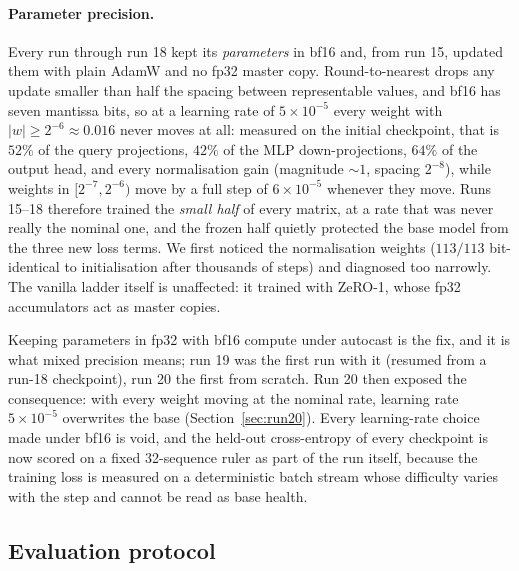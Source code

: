 \documentclass{article} %
\begin{document}
\paragraph{Parameter precision.}
\label{sec:precision}
Every run through run 18 kept its \emph{parameters} in bf16 and, from run 15, updated them with plain AdamW and no fp32 master copy. Round-to-nearest drops any update smaller than half the spacing between representable values, and bf16 has seven mantissa bits, so at a learning rate of $5\times10^{-5}$ every weight with $|w| \ge 2^{-6} \approx 0.016$ never moves at all: measured on the initial checkpoint, that is $52\%$ of the query projections, $42\%$ of the MLP down-projections, $64\%$ of the output head, and every normalisation gain (magnitude ${\sim}1$, spacing $2^{-8}$), while weights in $[2^{-7}, 2^{-6})$ move by a full step of $6\times10^{-5}$ whenever they move. Runs 15--18 therefore trained the \emph{small half} of every matrix, at a rate that was never really the nominal one, and the frozen half quietly protected the base model from the three new loss terms. We first noticed the normalisation weights ($113/113$ bit-identical to initialisation after thousands of steps) and diagnosed too narrowly. The vanilla ladder itself is unaffected: it trained with ZeRO-1, whose fp32 accumulators act as master copies.

Keeping parameters in fp32 with bf16 compute under autocast is the fix, and it is what mixed precision means; run 19 was the first run with it (resumed from a run-18 checkpoint), run 20 the first from scratch. Run 20 then exposed the consequence: with every weight moving at the nominal rate, learning rate $5\times10^{-5}$ overwrites the base (Section~\ref{sec:run20}). Every learning-rate choice made under bf16 is void, and the held-out cross-entropy of every checkpoint is now scored on a fixed 32-sequence ruler as part of the run itself, because the training loss is measured on a deterministic batch stream whose difficulty varies with the step and cannot be read as base health.

\subsection{Evaluation protocol}
\label{sec:evalproto}
\end{document}
